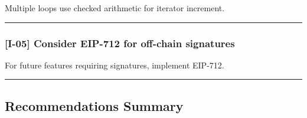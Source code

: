 \documentclass[
]{article}
\begin{document}
Multiple loops use checked arithmetic for iterator increment.

\begin{center}\rule{0.5\linewidth}{0.5pt}\end{center}

\subsubsection{{[}I-05{]} Consider EIP-712 for off-chain
signatures}\label{i-05-consider-eip-712-for-off-chain-signatures}

For future features requiring signatures, implement EIP-712.

\begin{center}\rule{0.5\linewidth}{0.5pt}\end{center}

\subsection{Recommendations Summary}\label{recommendations-summary}
\end{document}
